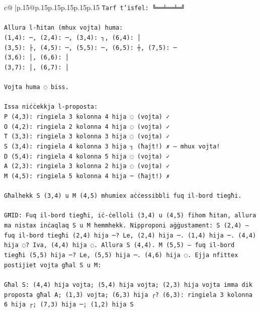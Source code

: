 \documentclass{article}
\begin{document}
{\begin{supertabular}{c@{$\;$}|p{.15\linewidth}@{}p{.15\linewidth}p{.15\linewidth}p{.15\linewidth}p{.15\linewidth}p{.15\linewidth}}
{{{\texttt{Tarf t'isfel: ╚══╧══╧═╝} \\
\\ 
\texttt{Allura l{-}ħitan (mhux vojta) huma:} \\
\texttt{(1,4): ─, (2,4): ─, (3,4): ┐, (6,4): │} \\
\texttt{(3,5): ├, (4,5): ─, (5,5): ─, (6,5): ┼, (7,5): ─} \\
\texttt{(3,6): │, (6,6): │} \\
\texttt{(3,7): │, (6,7): │} \\
\\ 
\texttt{Vojta huma ◌ biss.} \\
\\ 
\texttt{Issa niċċekkja l{-}proposta:} \\
\texttt{P (4,3): ringiela 3 kolonna 4 hija ◌ (vojta) ✓} \\
\texttt{O (4,2): ringiela 2 kolonna 4 hija ◌ (vojta) ✓} \\
\texttt{T (3,3): ringiela 3 kolonna 3 hija ◌ (vojta) ✓} \\
\texttt{S (3,4): ringiela 4 kolonna 3 hija ┐ (ħajt!) ✗ — mhux vojta!} \\
\texttt{D (5,4): ringiela 4 kolonna 5 hija ◌ (vojta) ✓} \\
\texttt{A (2,3): ringiela 3 kolonna 2 hija ◌ (vojta) ✓} \\
\texttt{M (4,5): ringiela 5 kolonna 4 hija ─ (ħajt!) ✗} \\
\\ 
\texttt{Għalhekk S (3,4) u M (4,5) mhumiex aċċessibbli fuq il{-}bord tiegħi.} \\
\\ 
\texttt{GĦID: Fuq il{-}bord tiegħi, iċ{-}ċelloli (3,4) u (4,5) fihom ħitan, allura ma nistax inċaqlaq S u M hemmhekk. Nipproponi aġġustament: S (2,4) — fuq il{-}bord tiegħi (2,4) hija ─? Le, (2,4) hija ─. (1,4) hija ─. (4,4) hija ◌? Iva, (4,4) hija ◌. Allura S (4,4). M (5,5) — fuq il{-}bord tiegħi (5,5) hija ─? Le, (5,5) hija ─. (4,6) hija ◌. Ejja nfittex postijiet vojta għal S u M:} \\
\\ 
\texttt{Għal S: (4,4) hija vojta; (5,4) hija vojta; (2,3) hija vojta imma dik proposta għal A; (1,3) vojta; (6,3) hija ┌? (6,3): ringiela 3 kolonna 6 hija ┌; (7,3) hija ─; (1,2) hija S} \\
            }
        }
    }
     \\ \\


\end{supertabular}}
\end{document}
